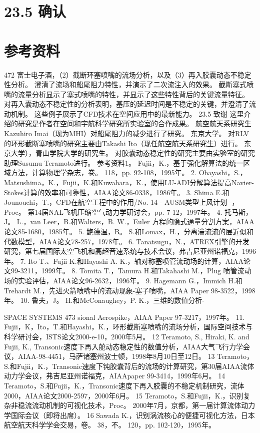 \documentclass[UTF8,11pt,a4paper,openany,fontset=fandol]{ctexbook}
\begin{document}
\section{23.5 确认}
\section{参考资料}
472 富士电子酒，（2）截断环塞喷嘴的流场分析，以及（3）再入胶囊动态不稳定性分析。 澄清了流场和船尾阻力特性，并演示了二次流注入的效果。 截断塞式喷嘴的流量分析显示了塞式喷嘴的特性，并显示了这些特性背后的关键流量特征。 对再入囊动态不稳定性的分析表明，基压的延迟时间是不稳定的关键，并澄清了流动机制。 这些例子展示了CFD技术在空间应用中的最新能力。 23.5 致谢 这里介绍的研究是作者在空间和宇航科学研究所实验室的合作成果。 航空航天系研究生Kazuhiro Imai（现为MHI）对船尾阻力的减少进行了研究。 东京大学。 对RLV的环形截断塞喷嘴的研究主要由Takashi Ito（现任航空航天系研究生）进行。 东京大学），青山学院大学的研究生。 对胶囊动态稳定性的研究主要由实验室的研究助理Susumu Teramoto进行。 参考资料1。 Fujii，K.，基于强化解算法的统一区域方法，计算物理学杂志，卷。 118，pp. 92-108，1995年。 2. Obayashi，S.，Matsushima，K.，Fujii，K.和Kuwahara，K.，使用LU-ADI分解算法提高Navier-Stokes计算的效率和可靠性，AIAA论文86-0338，1986年。 3. Shima E.和Jounouchi，T.，CFD在航空工程中的作用/No. 14 - AUSM类型上风计划 -，Proc。 第14届NAL飞机压缩空气动力学研讨会，pp. 7-12，1997年。 4. 托马斯，J。 L.，van Leer，B.和Walters，B. W.，Euler 方程的隐式通量分割方案，AIAA论文85-1680，1985年。 5. 鲍德温，B。 S.和Lomax，H.，分离湍流流的层近似和代数模型，AIAA论文78-257，1978年。 6. Tanatsugu，N.，ATREX引擎的开发研究，第七届国际太空飞机和高超音速系统与技术会议，弗吉尼亚州诺福克，1996年。 7. Ito T.、Fujii K.和Hayashi A. K.，轴对称塞喷管流动场的计算，AIAA论文99-3211，1999年。 8. Tomita T.，Tamura H.和Takahashi M.，Plug 喷管流动场的实验评估，AIAA论文96-2632，1996年。 9. Hagemann G.，Immich H.和Trehardt M.，先进火箭喷嘴中的流动现象-塞子喷嘴，AIAA Paper 98-3522，1998年。 10. 鲁夫，J。 H.和McConaughey，P. K.，三维的数值分析-

SPACE SYSTEMS 473 sional Aerospike，AIAA Paper 97-3217，1997年。 11. Fujii，K，Ito，T.和Hayashi，K.，环形截断塞喷嘴的流场分析，国际空间技术与科学研讨会，ISTS论文2000-e-10，2000年5月。 12 Teramoto, S., Hiraki, K. and Fujii, K., Transonic速度下再入舱动态稳定性的数值分析，AIAA大气飞行力学会议，AIAA-98-4451，马萨诸塞州波士顿，1998年8月10日至12日。 13 Teramoto，S.和Fujii，K.，Transonic速度下钝胶囊背后的流场的计算研究，第30届AIAA流体动力学会议，弗吉尼亚州诺福克，AIAApaper 99-3414，1999年6月。 14 Teramoto，S.和Fujii，K.，Transonic速度下再入胶囊的不稳定机制研究，流体2000，AIAA论文2000-2597，2000年6月。 15 Teramoto，S.和Fujii，K.，识别复杂非稳流流动机制的可视化技术，Proc。 2000年7月，京都，第一届计算流体动力学国际会议（即将出席）。 16 Sawada K.，识别涡流核心的便捷可视化方法，日本航空航天科学学会交易，卷。 38，不。 120，pp. 102-120，1995年。
\end{document}
